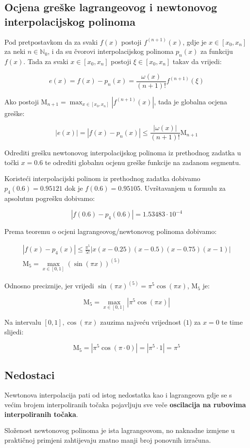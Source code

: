 \newpage

\subsection{Ocjena greške lagrangeovog i newtonovog interpolacijskog polinoma}

Pod pretpostavkom da za svaki $f(x)$ postoji $f^{(n+1)}(x)$, gdje je $x \in [x_0,x_n]$ za neki $n\in\mathbb{N}_0$, i da su čvorovi interpolacijskog polinoma $p_n(x)$ za funkciju $f(x)$. Tada za svaki $x\in[x_0,x_n]$ postoji $\xi\in[x_0,x_n]$ takav da vrijedi:

$$
e(x) = f(x) - p_n(x) = \frac{\omega(x)}{(n + 1)!}f^{(n+1)}(\xi)
$$

Ako postoji $\mathrm{M}_{n+1} = \max_{x\in[x_0,x_n]}\left|f^{(n+1)}(x)\right|$, tada je globalna ocjena greške:

$$
|e(x)| = |f(x) - p_n(x)| \leq \frac{|\omega(x)|}{(n+1)!}\mathrm{M}_{n+1}
$$

\begin{example}
    Odrediti grešku newtonovog interpolacijskog polinoma iz prethodnog zadatka u točki $x=0.6$ te odrediti globalnu ocjenu greške funkcije na zadanom segmentu.
\end{example}

Koristeći interpolacijski polinom iz prethodnog zadatka dobivamo $p_4(0.6) = 0.95121$ dok je $f(0.6) = 0.95105$. Uvrštavanjem u formulu za apsolutnu pogrešku dobivamo:

$$
|f(0.6)-p_4(0.6)| = 1.53483\cdot10^{-4}
$$

Prema teoremu o ocjeni lagrangeovog/newtonovog polinoma dobivamo:

\begin{gather}
|f(x)-p_4(x)| \leq \frac{\pi^5}{5!}|x(x-0.25)(x-0.5)(x-0.75)(x-1)|\\
\mathrm{M}_5=\max_{x\in[0,1]}(\sin(\pi x))^{(5)}
\end{gather}

Odnosno preciznije, jer vrijedi $\sin(\pi x)^{(5)} = \pi^5\cos(\pi x)$, $\mathrm{M}_5$ je:

$$
\mathrm{M}_5 = \max_{x\in[0,1]}\left|\pi^5\cos(\pi x)\right|
$$

Na intervalu $[0,1], \cos(\pi x)$ zauzima najveću vrijednost ($1$) za $x=0$ te time slijedi:

$$
\mathrm{M}_5 = \left|\pi^5\cos(\pi \cdot 0)\right| = \left|\pi^5\cdot1\right| = \pi^5
$$

\subsection{Nedostaci}

Newtonova interpolacija pati od istog nedostatka kao i lagrangeova gdje se s većim brojem interpoliranih točaka pojavljuju sve veče \textbf{oscilacija na rubovima interpoliranih točaka}.

Složenost newtonovog polinoma je ista lagrangeovom, no naknadne izmjene u praktičnoj primjeni zahtijevaju znatno manji broj ponovnih izračuna.
